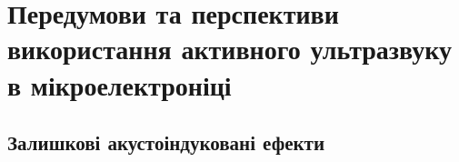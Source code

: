 \chapter{Передумови та перспективи використання активного ультразвуку в мікроелектроніці\label{Oglyad}}
\section{Залишкові акустоіндуковані ефекти}


\cite{Bahar2003,Ostap:PhotoLum,US:ZnSe,Zaver2007,ZobovFTP2008,RITTER2008,Wosinski,Ostapenko1999,Zaver,
Zaver:2008r,Ostrov2002FTPr,Ostrov2000FTPr,Vlasov2009r,Zaver2005,Davletova2008,Olikh:PZTF2006,Tagaev,
Teterkin2009r,PodolHivr,UST:OstrovCsI,YOlikh2007TPLr,Parchinskii2006r,Gorb2010,YOlikh2006TPLr,Parchinskii2000r,
YOlikhTPL2011r,Olikh:FTP2011,Olikh:SEMT2007,Zaveryukhin2002:2,YOlikh2005,RomanyukSST,ROMANYUK2005,Roman:2006JAP,
Roman:2007APL,Roman:2010JAP,YOlikh2010JL,US:FeSiC,Kuryliuk2009,Buscemi,Cuberes,Olikh:SPQEO2010}


